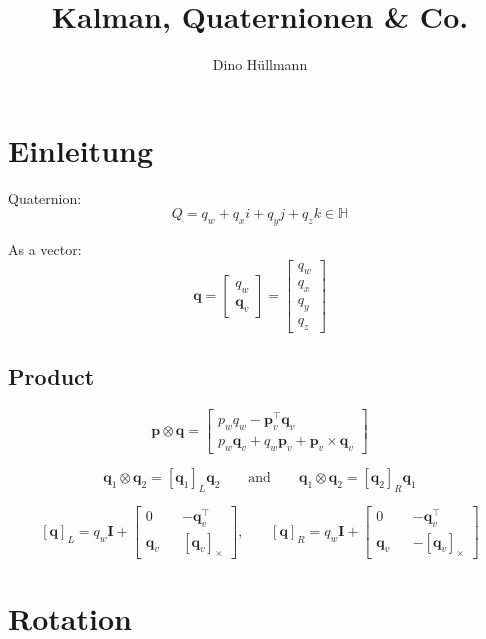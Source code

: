 \documentclass[11pt,a4paper]{scrartcl}
\author{Dino Hüllmann}
\title{Kalman, Quaternionen & Co.}
\renewcommand\vec{\mathbf}
\newcommand{\quat}[1]{\mathbf{#1}}
\newcommand{\Matrix}[1]{\mathbf{#1}}
\newcommand{\skewop}[1]{\left[#1\right]_\times}
\begin{document}
\section{Einleitung}

Quaternion:
\begin{equation}
	Q = q_w + q_x i + q_y j + q_z k \in \mathbb{H}
\end{equation}

As a vector:
\begin{equation}
	\quat{q}
	=
	\begin{bmatrix}
		q_w \\ \vec{q}_v
	\end{bmatrix}
	=
	\begin{bmatrix}
		q_w \\ q_x \\ q_y \\ q_z
	\end{bmatrix}
\end{equation}

\subsection{Product}

\begin{equation}
	\quat{p} \otimes \quat{q}
	=
	\begin{bmatrix}
		p_w q_w - \vec{p}_v^\intercal \vec{q}_v \\
		p_w \vec{q}_v + q_w \vec{p}_v + \vec{p}_v \times \vec{q}_v
	\end{bmatrix}
\end{equation}

\begin{equation}
	\quat{q}_1 \otimes \quat{q}_2 = \left[\quat{q}_1\right]_L \quat{q}_2
	\qquad \text{and} \qquad
	\quat{q}_1 \otimes \quat{q}_2 = \left[\quat{q}_2\right]_R \quat{q}_1
\end{equation}

\begin{equation}
	\left[\quat{q}\right]_L
	=
	q_w \Matrix{I}
	+
	\begin{bmatrix}
		0 && -\quat{q}_v^\intercal \\
		\quat{q}_v && \skewop{\quat{q}_v}
	\end{bmatrix}\text{,}	
	\qquad
	\left[\quat{q}\right]_R
	=
	q_w \Matrix{I}
	+
	\begin{bmatrix}
	0 && -\quat{q}_v^\intercal \\
	\quat{q}_v && -\skewop{\quat{q}_v}
	\end{bmatrix}
\end{equation}

\section{Rotation}
\end{document}

